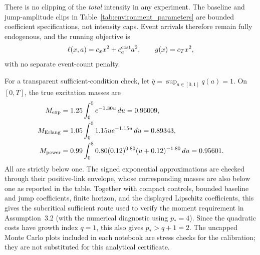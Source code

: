 \documentclass[11pt]{article}
\begin{document}
There is no clipping of the \emph{total} intensity in any experiment. The
baseline and jump-amplitude clips in Table~\ref{tab:environment_parameters}
are bounded coefficient specifications, not intensity caps. Event arrivals
therefore remain fully endogenous, and the running objective is
\[
  \ell(x,a)=c_xx^2+c_a^{\rm cost}a^2,
  \qquad g(x)=c_Tx^2,
\]
with no separate event-count penalty.

For a transparent sufficient-condition check, let
\(\bar q=\sup_{a\in[0,1]}q(a)=1\). On \([0,T]\), the true excitation masses are
\[
\begin{aligned}
M_{\rm exp}
 &=1.25\int_0^5 e^{-1.30u}\,du=0.96009,\\
M_{\rm Erlang}
 &=1.05\int_0^5 1.15u e^{-1.15u}\,du=0.89343,\\
M_{\rm power}
 &=0.99\int_0^8 0.80(0.12)^{0.80}(u+0.12)^{-1.80}\,du=0.95601.
\end{aligned}
\]
All are strictly below one. The signed exponential approximations are checked
through their positive-link envelope, whose corresponding masses are also
below one as reported in the table. Together with compact controls, bounded
baseline and jump coefficients, finite horizon, and the displayed Lipschitz
coefficients, this gives the subcritical sufficient route used to verify the
moment requirement in Assumption~3.2 (with the numerical diagnostic using
\(p_*=4\)). Since the quadratic costs have growth index \(q=1\), this also
gives \(p_*>q+1=2\). The uncapped Monte Carlo plots included in each notebook are
stress checks for the calibration; they are not substituted for this
analytical certificate.
\end{document}
